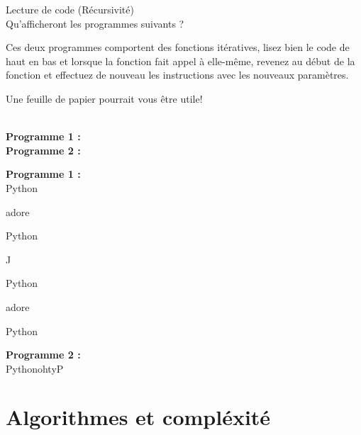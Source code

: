 \begin{Exercice}[5 min] Lecture de code (Récursivité)\\

Qu'afficheront les programmes suivants ? \\

\begin{conseil}
   Ces deux programmes comportent des fonctions itératives, lisez bien le code de haut en bas et lorsque la fonction fait appel à elle-même, revenez au début de la fonction et effectuez de nouveau les instructions avec les nouveaux paramètres.
   
   Une feuille de papier pourrait vous être utile!\\
\end{conseil}

\textbf{\\Programme 1 :} \\

     

\textbf{Programme 2 :} \\

    

    
\begin{solution}
\textbf{Programme 1 :} \\

    Python
    
    adore
    
    Python
    
    J
    
    Python
    
    adore
    
    Python

    
\end{solution}


\begin{solution}   
\textbf{Programme 2 :} \\

    PythonohtyP
    
\end{solution}

\end{Exercice}

\section{Algorithmes et compléxité}

